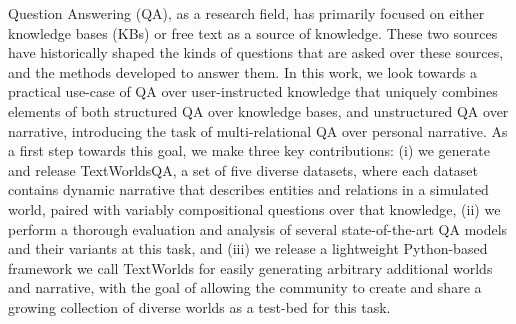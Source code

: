 Question Answering (QA), as a research field, has primarily focused on either knowledge bases (KBs) or free text as a source of knowledge. These two sources have historically shaped the kinds of questions that are asked over these sources, and the methods developed to answer them. In this work, we look towards a practical use-case of QA over user-instructed knowledge that uniquely combines elements of both structured QA over knowledge bases, and unstructured QA over narrative, introducing the task of multi-relational QA over personal narrative. As a first step towards this goal, we make three key contributions: (i) we generate and release TextWorldsQA, a set of five diverse datasets, where each dataset contains dynamic narrative that describes entities and relations in a simulated world, paired with variably compositional questions over that knowledge, (ii) we perform a thorough evaluation and analysis of several state-of-the-art QA models and their variants at this task, and (iii) we release a lightweight Python-based framework we call TextWorlds for easily generating arbitrary additional worlds and narrative, with the goal of allowing the community to create and share a growing collection of diverse worlds as a test-bed for this task.
